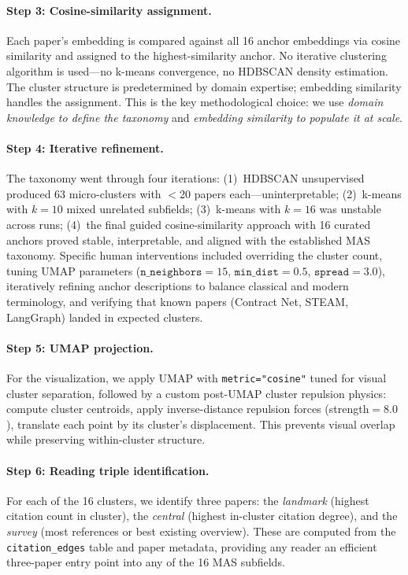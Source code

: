 \documentclass{article}
\begin{document}
\paragraph{Step 3: Cosine-similarity assignment.}
Each paper's embedding is compared against all 16 anchor embeddings via cosine
similarity and assigned to the highest-similarity anchor. No iterative clustering
algorithm is used---no k-means convergence, no HDBSCAN density estimation. The cluster
structure is predetermined by domain expertise; embedding similarity handles the
assignment. This is the key methodological choice: we use \emph{domain knowledge to
define the taxonomy} and \emph{embedding similarity to populate it at scale}.

\paragraph{Step 4: Iterative refinement.}
The taxonomy went through four iterations: (1)~HDBSCAN unsupervised produced 63
micro-clusters with $<$20 papers each---uninterpretable; (2)~k-means with $k{=}10$
mixed unrelated subfields; (3)~k-means with $k{=}16$ was unstable across runs;
(4)~the final guided cosine-similarity approach with 16 curated anchors proved stable,
interpretable, and aligned with the established MAS taxonomy. Specific human
interventions included overriding the cluster count, tuning UMAP parameters
($\texttt{n\_neighbors}{=}15$, $\texttt{min\_dist}{=}0.5$, $\texttt{spread}{=}3.0$),
iteratively refining anchor descriptions to balance classical and modern terminology,
and verifying that known papers (Contract Net, STEAM, LangGraph) landed in expected
clusters.

\paragraph{Step 5: UMAP projection.}
For the visualization, we apply UMAP with \texttt{metric="cosine"} tuned for visual
cluster separation, followed by a custom post-UMAP cluster repulsion physics: compute
cluster centroids, apply inverse-distance repulsion forces (strength${}=8.0$), translate
each point by its cluster's displacement. This prevents visual overlap while preserving
within-cluster structure.%

\paragraph{Step 6: Reading triple identification.}
For each of the 16 clusters, we identify three papers: the \emph{landmark} (highest
citation count in cluster), the \emph{central} (highest in-cluster citation degree),
and the \emph{survey} (most references or best existing overview). These are computed
from the \texttt{citation\_edges} table and paper metadata, providing any reader an
efficient three-paper entry point into any of the 16 MAS subfields.
\end{document}

